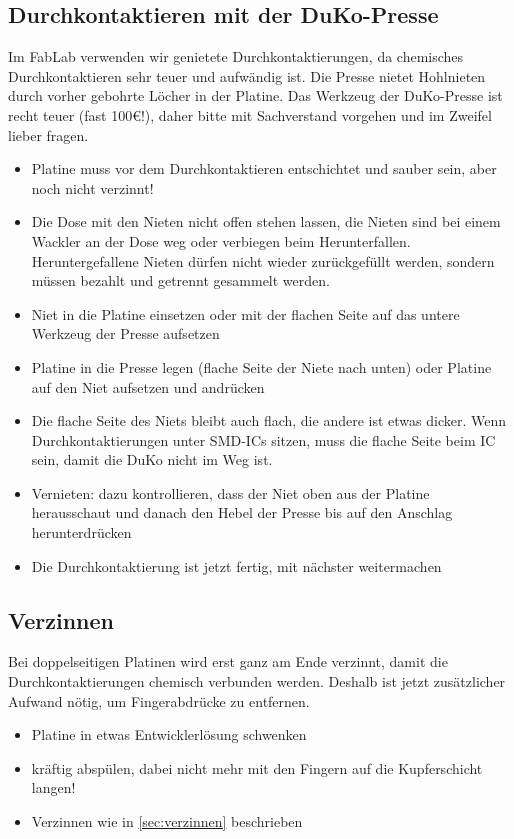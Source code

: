 \documentclass{\basedir/fablab-document}
\begin{document}
\subsection{Durchkontaktieren mit der DuKo-Presse}
Im FabLab verwenden wir genietete Durchkontaktierungen, da chemisches Durchkontaktieren sehr teuer und aufwändig ist. Die Presse nietet Hohlnieten durch vorher gebohrte Löcher in der Platine. Das Werkzeug der DuKo-Presse ist recht teuer (fast 100€!), daher bitte mit Sachverstand vorgehen und im Zweifel lieber fragen.
\begin{itemize}
\item Platine muss vor dem Durchkontaktieren entschichtet und sauber sein, aber noch nicht verzinnt!
\item Die Dose mit den Nieten nicht offen stehen lassen, die Nieten sind bei einem Wackler an der Dose weg oder verbiegen beim Herunterfallen. Heruntergefallene Nieten dürfen nicht wieder zurückgefüllt werden, sondern müssen bezahlt und getrennt gesammelt werden.
\item Niet in die Platine einsetzen oder mit der flachen Seite auf das untere Werkzeug der Presse aufsetzen
\item Platine in die Presse legen (flache Seite der Niete nach unten) oder Platine auf den Niet aufsetzen und andrücken
\item Die flache Seite des Niets bleibt auch flach, die andere ist etwas dicker. Wenn Durchkontaktierungen unter SMD-ICs sitzen, muss die flache Seite beim IC sein, damit die DuKo nicht im Weg ist.
\item Vernieten: dazu kontrollieren, dass der Niet oben aus der Platine herausschaut und danach den Hebel der Presse bis auf den Anschlag herunterdrücken
\item Die Durchkontaktierung ist jetzt fertig, mit nächster weitermachen
\end{itemize}

\subsection{Verzinnen}
Bei doppelseitigen Platinen wird erst ganz am Ende verzinnt, damit die Durchkontaktierungen chemisch verbunden werden. Deshalb ist jetzt zusätzlicher Aufwand nötig, um Fingerabdrücke zu entfernen.
\begin{itemize}
 \item Platine in etwas Entwicklerlösung schwenken
 \item kräftig abspülen, dabei nicht mehr mit den Fingern auf die Kupferschicht langen!
 \item Verzinnen wie in \ref{sec:verzinnen} beschrieben
\end{itemize}
\end{document}
